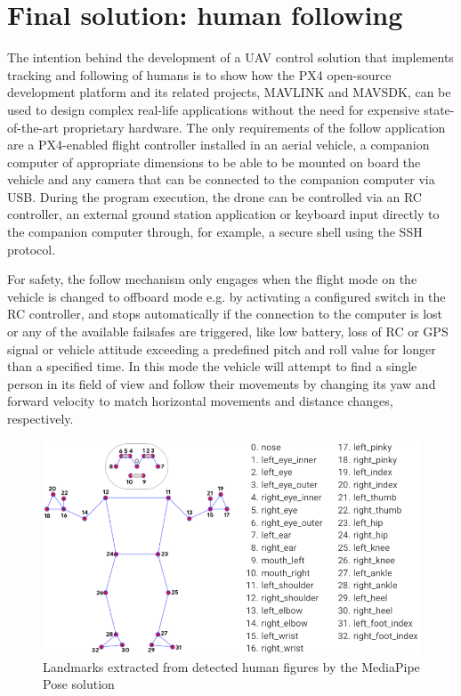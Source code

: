 




\section{Final solution: human following}
\label{sec:follow}

The intention behind the development of a UAV control solution that implements tracking and following of humans is to show how the PX4 open-source development platform and its related projects, MAVLINK and MAVSDK, can be used to design complex real-life applications without the need for expensive state-of-the-art proprietary hardware.
The only requirements of the follow application are a PX4-enabled flight controller installed in an aerial vehicle, a companion computer of appropriate dimensions to be able to be mounted on board the vehicle and any camera that can be connected to the companion computer via USB.
During the program execution, the drone can be controlled via an RC controller, an external ground station application or keyboard input directly to the companion computer through, for example, a secure shell using the SSH protocol.

For safety, the follow mechanism only engages when the flight mode on the vehicle is changed to offboard mode e.g. by activating a configured switch in the RC controller, and stops automatically if the connection to the computer is lost or any of the available failsafes are triggered, like low battery, loss of RC or GPS signal or vehicle attitude exceeding a predefined pitch and roll value for longer than a specified time.
In this mode the vehicle will attempt to find a single person in its field of view and follow their movements by changing its yaw and forward velocity to match horizontal movements and distance changes, respectively.

\begin{figure}
  \centering
  \includegraphics[width=\textwidth, keepaspectratio]{img/pose-landmarks.png}
  \caption{Landmarks extracted from detected human figures by the MediaPipe Pose solution}
  \label{fig:pose-landmarks}
\end{figure}

